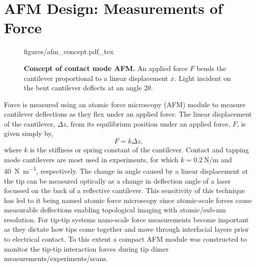 \documentclass{article}
\begin{document}
\section{AFM Design: Measurements of Force}

\begin{wrapfigure}{O}{0.38\textwidth}
\centering
\vspace{-10pt}
\fontsize{10pt}{1em}\selectfont
\def\svgwidth{\textwidth}
{figures/afm_concept.pdf_tex}
\caption[Concept of contact mode AFM]{\textbf{Concept of contact mode AFM.} An applied force $F$ bends the cantilever proportional to a linear displacement $x$. Light incident on the bent cantilever deflects at an angle $2\theta$.}
\label{fig:afm_concept}
\vspace{-5pt}
\end{wrapfigure}

Force is measured using an atomic force microscopy (AFM) module to measure cantilever deflections as they flex under an applied force. The linear displacement of the cantilever, $\Delta z$, from its equilibrium position under an applied force, $F$, is given simply by,
\begin{equation} F=k\Delta z, \label{eq:hookes_law} \end{equation}
where $k$ is the stiffness or spring constant of the cantilever. Contact and tapping mode cantilevers are most used in experiments, for which $k=\SI{0.2}{\newton\per\metre}$ and \SI{40}{\newton\per\metre}, respectively. The change in angle caused by a linear displacement at the tip can be measured optically as a change in deflection angle of a laser focussed on the back of a reflective cantilever. This sensitivity of this technique has led to it being named atomic force microscopy since atomic-scale forces cause measurable deflections enabling topological imaging with {\color{red}atomic/sub-nm} resolution.
For tip-tip systems nano-scale force measurements become important as they dictate how tips come together and move through interfacial layers prior to electrical contact. To this extent a compact AFM module was constructed to monitor the tip-tip interaction forces during tip dimer {\color{red}measurements/experiments/scans}.
\end{document}
